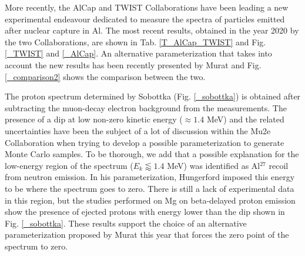 \documentclass[12pt,a4paper,openright, oneside, titlepage]{book} %
\begin{document}
\noindent 
More recently, the AlCap \cite{AlCap:2018} and TWIST \cite{TWIST:2020} Collaborations 
have been leading a new experimental endeavour dedicated to measure the spectra 
of particles emitted after nuclear capture in Al. 
The most recent results, obtained in the year 2020 by the two Collaborations, 
are shown in Tab. \ref{T_AlCap_TWIST} and Fig. \ref{_TWIST} and  \ref{_AlCap}. 
An alternative parameterization that takes into account the new results has been recently presented by Murat \cite{Pasha:spectra} and Fig. \ref{_comparison2} \cite{io:comparison} shows the comparison between the two.

\noindent The proton spectrum determined by Sobottka (Fig. \ref{_sobottka}) 
is obtained after subtracting the muon-decay electron background from the measurements. 
The presence of a dip at low non-zero kinetic energy ($\approx 1.4$ MeV) 
and the related uncertainties have been the subject of a lot of  discussion 
within the Mu2e Collaboration \cite{io:sobottka} 
when trying to develop a possible parameterization to generate
Monte Carlo samples. 
To be thorough, we add that a possible explanation for 
the low-energy region of the spectrum 
($E_k\lessapprox1.4$ MeV) was identified as Al$^{27}$ recoil from neutron emission. 
In his parameterization, Hungerford imposed this energy to be where the spectrum goes to zero.
There is still a lack of experimental data in this region, 
but the studies performed on Mg \cite{IDS:2016} on beta-delayed proton emission 
show the presence of ejected protons with energy lower than the dip shown in Fig. \ref{_sobottka}. 
These results support the choice of an alternative parameterization proposed by Murat this year
that forces the zero point of the spectrum to zero.\\
\end{document}
